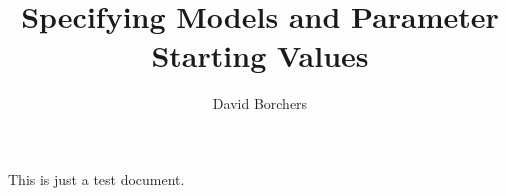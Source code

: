 \documentclass{article}
\title{Specifying Models and Parameter Starting Values}
\author{David Borchers}
\begin{document}
\maketitle


This is just a test document. 
\end{document}
